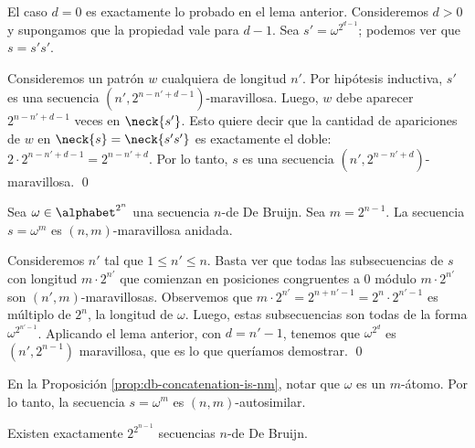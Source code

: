 \begin{demo}
  El caso $d = 0$ es exactamente lo probado en el lema anterior.
  Consideremos $d > 0$ y supongamos que la propiedad vale para $d - 1$.
  Sea $s' = \omega^{2^{d-1}}$; podemos ver que $s = s's'$.

  Consideremos un patrón $w$ cualquiera de longitud $n'$. Por hipótesis
  inductiva, $s'$ es una secuencia $(n',2^{n-n'+d-1})$-maravillosa. Luego, $w$
  debe aparecer $2^{n-n'+d-1}$ veces en $\neck{s'}$.
  Esto quiere decir que la cantidad de apariciones de $w$ en $\neck{s} =
    \neck{s's'}$ es exactamente el doble: $2 \cdot 2^{n-n'+d-1} = 2^{n-n'+d}$.
  Por lo tanto, $s$ es una secuencia $(n',2^{n-n'+d})$-maravillosa. \qed
\end{demo}

\begin{prop}
  \label{prop:db-concatenation-is-nm}
  Sea $\omega \in \alphabet^{2^n}$ una secuencia $n$-de De Bruijn.
  Sea $m = 2^{n-1}$. La secuencia $s = \omega^{m}$ es $(n,m)$-maravillosa
  anidada.
\end{prop}

\begin{demo}
  Consideremos $n'$ tal que $1 \leq n' \leq n$. Basta ver que todas las
  subsecuencias de $s$ con longitud $m \cdot 2^{n'}$ que comienzan en
  posiciones congruentes a $0$ módulo $m \cdot 2^{n'}$ son
  $(n',m)$-maravillosas. Observemos que $m \cdot 2^{n'} = 2^{n+n'-1} = 2^n
    \cdot 2^{n'-1}$ es múltiplo de $2^n$, la longitud de $\omega$.
  Luego, estas subsecuencias son todas de la forma $\omega^{2^{n'-1}}$.
  Aplicando el lema anterior, con $d = n'-1$, tenemos que $\omega^{2^d}$
  es $(n',2^{n-1})$ maravillosa, que es lo que queríamos demostrar. \qed
\end{demo}

\begin{obs}
  En la Proposición \ref{prop:db-concatenation-is-nm}, notar que $\omega$ es un
  $m$-átomo. Por lo tanto, la secuencia $s = \omega^m$ es $(n,m)$-autosimilar.
\end{obs}

\begin{lema}
  \label{lema:db-sequence-count}
  Existen exactamente $2^{2^{n-1}}$ secuencias $n$-de De Bruijn.
\end{lema}

